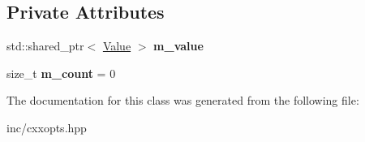 \subsection*{Private Attributes}
\begin{DoxyCompactItemize}
\item 
std\+::shared\+\_\+ptr$<$ \hyperlink{classcxxopts_1_1Value}{Value} $>$ {\bfseries m\+\_\+value}\hypertarget{classcxxopts_1_1OptionValue_a4bbafc7ad74075d05aebd5ddc18d83cd}{}\label{classcxxopts_1_1OptionValue_a4bbafc7ad74075d05aebd5ddc18d83cd}

\item 
size\+\_\+t {\bfseries m\+\_\+count} = 0\hypertarget{classcxxopts_1_1OptionValue_a1c8d74b5c22ef6350d3a2350c76c6613}{}\label{classcxxopts_1_1OptionValue_a1c8d74b5c22ef6350d3a2350c76c6613}

\end{DoxyCompactItemize}


The documentation for this class was generated from the following file\+:\begin{DoxyCompactItemize}
\item 
inc/cxxopts.\+hpp\end{DoxyCompactItemize}
